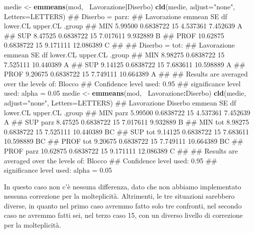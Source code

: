 \documentclass[a4paper,12pt,oneside]{book}
\newenvironment{Shaded}{\begin{snugshade}}{\end{snugshade}}
\newcommand{\KeywordTok}[1]{\textcolor[rgb]{0.13,0.29,0.53}{\textbf{#1}}}
\newcommand{\DataTypeTok}[1]{\textcolor[rgb]{0.13,0.29,0.53}{#1}}
\newcommand{\StringTok}[1]{\textcolor[rgb]{0.31,0.60,0.02}{#1}}
\newcommand{\OperatorTok}[1]{\textcolor[rgb]{0.81,0.36,0.00}{\textbf{#1}}}
\newcommand{\NormalTok}[1]{#1}
\theoremstyle{definition}
\theoremstyle{definition}
\theoremstyle{definition}
\theoremstyle{remark}
\begin{document}
\begin{Shaded}
\begin{Highlighting}[]
\NormalTok{medie <-}\StringTok{ }\KeywordTok{emmeans}\NormalTok{(mod, }\OperatorTok{~}\NormalTok{Lavorazione}\OperatorTok{|}\NormalTok{Diserbo)}
\KeywordTok{cld}\NormalTok{(medie, }\DataTypeTok{adjust=}\StringTok{"none"}\NormalTok{, }\DataTypeTok{Letters=}\NormalTok{LETTERS)}
\NormalTok{## Diserbo = parz:}
\NormalTok{##  Lavorazione   emmean        SE df lower.CL  upper.CL .group}
\NormalTok{##  MIN          5.99500 0.6838722 15 4.537361  7.452639  A    }
\NormalTok{##  SUP          8.47525 0.6838722 15 7.017611  9.932889   B   }
\NormalTok{##  PROF        10.62875 0.6838722 15 9.171111 12.086389    C  }
\NormalTok{## }
\NormalTok{## Diserbo = tot:}
\NormalTok{##  Lavorazione   emmean        SE df lower.CL  upper.CL .group}
\NormalTok{##  MIN          8.98275 0.6838722 15 7.525111 10.440389  A    }
\NormalTok{##  SUP          9.14125 0.6838722 15 7.683611 10.598889  A    }
\NormalTok{##  PROF         9.20675 0.6838722 15 7.749111 10.664389  A    }
\NormalTok{## }
\NormalTok{## Results are averaged over the levels of: Blocco }
\NormalTok{## Confidence level used: 0.95 }
\NormalTok{## significance level used: alpha = 0.05}
\NormalTok{medie <-}\StringTok{ }\KeywordTok{emmeans}\NormalTok{(mod, }\OperatorTok{~}\NormalTok{Lavorazione}\OperatorTok{:}\NormalTok{Diserbo)}
\KeywordTok{cld}\NormalTok{(medie, }\DataTypeTok{adjust=}\StringTok{"none"}\NormalTok{, }\DataTypeTok{Letters=}\NormalTok{LETTERS)}
\NormalTok{##  Lavorazione Diserbo   emmean        SE df lower.CL  upper.CL .group}
\NormalTok{##  MIN         parz     5.99500 0.6838722 15 4.537361  7.452639  A    }
\NormalTok{##  SUP         parz     8.47525 0.6838722 15 7.017611  9.932889   B   }
\NormalTok{##  MIN         tot      8.98275 0.6838722 15 7.525111 10.440389   BC  }
\NormalTok{##  SUP         tot      9.14125 0.6838722 15 7.683611 10.598889   BC  }
\NormalTok{##  PROF        tot      9.20675 0.6838722 15 7.749111 10.664389   BC  }
\NormalTok{##  PROF        parz    10.62875 0.6838722 15 9.171111 12.086389    C  }
\NormalTok{## }
\NormalTok{## Results are averaged over the levels of: Blocco }
\NormalTok{## Confidence level used: 0.95 }
\NormalTok{## significance level used: alpha = 0.05}
\end{Highlighting}
\end{Shaded}

In questo caso non c'è nessuna differenza, dato che non abbiamo
implementato nessuna correzione per la molteplicità. Altrimenti, le tre
situazioni sarebbero diverse, in quanto nel primo caso avremmo fatto
solo tre confronti, nel secondo caso ne avremmo fatti sei, nel terzo
caso 15, con un diverso livello di correzione per la molteplicità.
\end{document}
